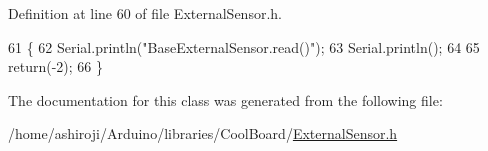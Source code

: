 Definition at line 60 of file External\+Sensor.\+h.


\begin{DoxyCode}
61     \{
62         Serial.println(\textcolor{stringliteral}{"BaseExternalSensor.read()"});
63         Serial.println();       
64         
65         \textcolor{keywordflow}{return}(-2);
66     \}
\end{DoxyCode}


The documentation for this class was generated from the following file\+:\begin{DoxyCompactItemize}
\item 
/home/ashiroji/\+Arduino/libraries/\+Cool\+Board/\hyperlink{ExternalSensor_8h}{External\+Sensor.\+h}\end{DoxyCompactItemize}
